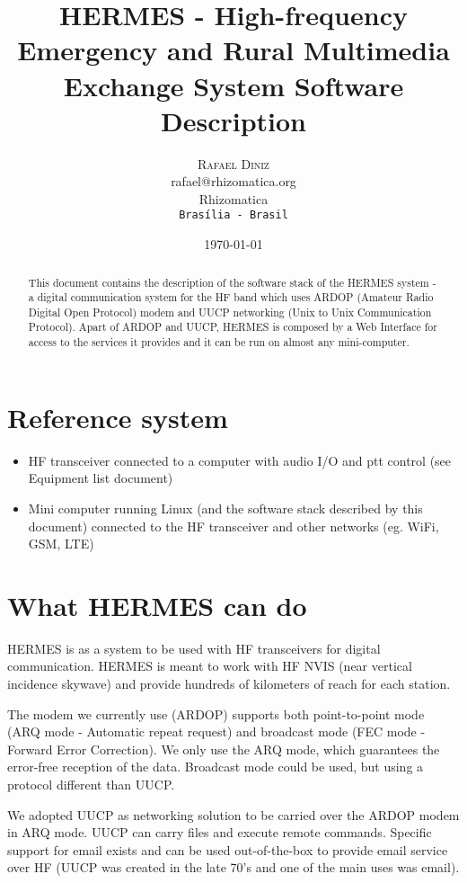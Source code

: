 \documentclass[11pt,a4paper]{article}
\title{HERMES - High-frequency Emergency and Rural Multimedia Exchange
  System Software Description}
\author{
       \large
        \textsc{Rafael Diniz}
        \mbox{}\\ %
        rafael@rhizomatica.org\\
        \mbox{Rhizomatica} \\ %
        \normalsize
        \texttt{Brasília - Brasil}\\
}
\date{\today}
\begin{document}
\maketitle

\begin{abstract}

This document contains the description of the software stack of the HERMES
system - a digital communication system for the HF band which uses ARDOP
(Amateur Radio Digital Open Protocol) modem and UUCP networking (Unix to Unix
Communication Protocol). Apart of ARDOP and UUCP, HERMES is composed by a
Web Interface for access to the services it provides and it can be run
on almost any mini-computer.

\end{abstract}

\newpage

\tableofcontents

\section{Reference system}

\begin{itemize}
\item HF transceiver connected to a computer with audio I/O and ptt control
  (see Equipment list document)
\item Mini computer running Linux (and the software stack described by this
  document) connected to the HF transceiver and other networks (eg. WiFi,
  GSM, LTE)
\end{itemize}

\section{What HERMES can do}

HERMES is as a system to be used with HF transceivers for digital
communication. HERMES is meant to work with HF NVIS (near vertical incidence
skywave) and provide hundreds of kilometers of reach for each station.

The modem we currently use (ARDOP) supports both point-to-point mode (ARQ
mode - Automatic repeat request) and broadcast mode (FEC mode - Forward
Error Correction). We only use the ARQ mode, which guarantees the error-free
reception of the data. Broadcast mode could be used, but using a protocol
different than UUCP.

We adopted UUCP as networking solution to be carried over the ARDOP modem in
ARQ mode. UUCP can carry files and execute remote commands. Specific support
for email exists and can be used out-of-the-box to provide email service over
HF (UUCP was created in the late 70's and one of the main uses was email).
\end{document}
